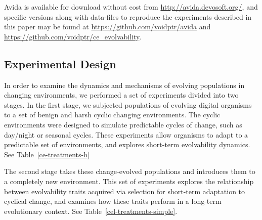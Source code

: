 \documentclass[10pt,letterpaper]{article}
\begin{document}
Avida is available for download without cost from \url{http://avida.devosoft.org/}, and specific versions along with data-files to reproduce the experiments described in this paper may be found at \url{https://github.com/voidptr/avida} and \url{https://github.com/voidptr/ce_evolvability}.

\subsection*{Experimental Design}
In order to examine the dynamics and mechanisms of evolving populations in changing environments, we performed a set of experiments divided into two stages. In the first stage, we subjected populations of evolving digital organisms to a set of benign and harsh cyclic changing environments. The cyclic environments were designed to simulate predictable cycles of change, such as day/night or seasonal cycles. These experiments allow organisms to adapt to a predictable set of environments, and explores short-term evolvability dynamics. See Table~\ref{ce-treatments-h}

The second stage takes these change-evolved populations and introduces them to a completely new environment. This set of experiments explores the relationship between evolvability traits acquired via selection for short-term adaptation to cyclical change, and examines how these traits perform in a long-term evolutionary context. See Table~\ref{cel-treatments-simple}.




\end{document}
